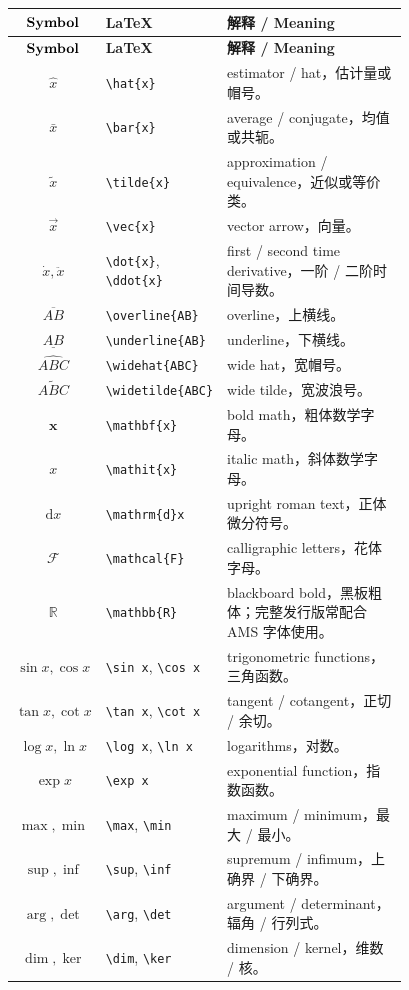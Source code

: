 \documentclass[11pt]{article}
\begin{document}
\begin{longtable}{>{$}c<{$} p{0.30\linewidth} p{0.48\linewidth}}
\hline
\text{\textbf{Symbol}} & \textbf{LaTeX} & \textbf{解释 / Meaning} \\
\hline
\endfirsthead
\hline
\text{\textbf{Symbol}} & \textbf{LaTeX} & \textbf{解释 / Meaning} \\
\hline
\endhead
\hat{x} & \verb|\hat{x}| & estimator / hat，估计量或帽号。 \\
\bar{x} & \verb|\bar{x}| & average / conjugate，均值或共轭。 \\
\tilde{x} & \verb|\tilde{x}| & approximation / equivalence，近似或等价类。 \\
\vec{x} & \verb|\vec{x}| & vector arrow，向量。 \\
\dot{x}, \ddot{x} & \verb|\dot{x}|, \verb|\ddot{x}| & first / second time derivative，一阶 / 二阶时间导数。 \\
\overline{AB} & \verb|\overline{AB}| & overline，上横线。 \\
\underline{AB} & \verb|\underline{AB}| & underline，下横线。 \\
\widehat{ABC} & \verb|\widehat{ABC}| & wide hat，宽帽号。 \\
\widetilde{ABC} & \verb|\widetilde{ABC}| & wide tilde，宽波浪号。 \\
\mathbf{x} & \verb|\mathbf{x}| & bold math，粗体数学字母。 \\
\mathit{x} & \verb|\mathit{x}| & italic math，斜体数学字母。 \\
\mathrm{d}x & \verb|\mathrm{d}x| & upright roman text，正体微分符号。 \\
\mathcal{F} & \verb|\mathcal{F}| & calligraphic letters，花体字母。 \\
ℝ & \verb|\mathbb{R}| & blackboard bold，黑板粗体；完整发行版常配合 AMS 字体使用。 \\
\sin x, \cos x & \verb|\sin x|, \verb|\cos x| & trigonometric functions，三角函数。 \\
\tan x, \cot x & \verb|\tan x|, \verb|\cot x| & tangent / cotangent，正切 / 余切。 \\
\log x, \ln x & \verb|\log x|, \verb|\ln x| & logarithms，对数。 \\
\exp x & \verb|\exp x| & exponential function，指数函数。 \\
\max, \min & \verb|\max|, \verb|\min| & maximum / minimum，最大 / 最小。 \\
\sup, \inf & \verb|\sup|, \verb|\inf| & supremum / infimum，上确界 / 下确界。 \\
\arg, \det & \verb|\arg|, \verb|\det| & argument / determinant，辐角 / 行列式。 \\
\dim, \ker & \verb|\dim|, \verb|\ker| & dimension / kernel，维数 / 核。 \\
\hline
\end{longtable}
\end{document}
